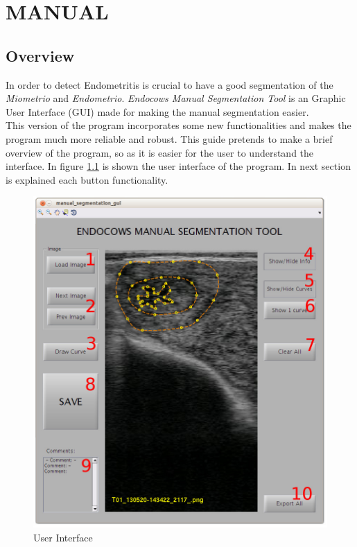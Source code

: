 \documentclass[12pt,a4paper,titlepage]{report}
\begin{document}
\chapter{MANUAL}

\section{Overview}

In order to detect Endometritis is crucial to have a good segmentation of the \emph{Miometrio} and \emph{Endometrio}. \emph{Endocows Manual Segmentation Tool} is an Graphic User Interface (GUI) made for making the manual segmentation easier.\\

This version of the program incorporates some new functionalities and makes the program much more reliable and robust. This guide pretends to make a brief overview of the program, so as it is easier for the user to understand the interface. In figure \ref{fig:interfaz} is shown the user interface of the program. In next section is explained each button functionality.

\begin{figure}[h!]
	\begin{center}
	\includegraphics[width=1\textwidth]{interfaz.jpg}
	\end{center}
	\caption{User Interface}
	\label{fig:interfaz}
\end{figure}
\end{document}
